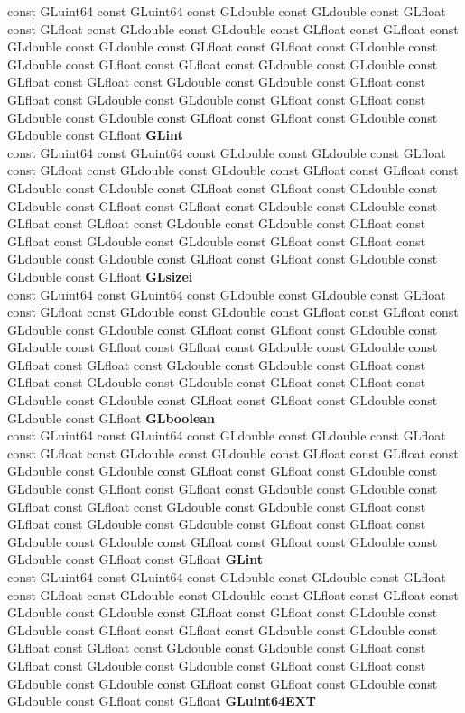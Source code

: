 \begin{DoxyCompactItemize}
\begin{tabbing}
\>const GLuint64 const GLuint64 const GLdouble const GLdouble const GLfloat const GLfloat const GLdouble const GLdouble const GLfloat const GLfloat const GLdouble const GLdouble const GLfloat const GLfloat const GLdouble const GLdouble const GLfloat const GLfloat const GLdouble const GLdouble const GLfloat const GLfloat const GLdouble const GLdouble const GLfloat const GLfloat const GLdouble const GLdouble const GLfloat const GLfloat const GLdouble const GLdouble const GLfloat const GLfloat const GLdouble const GLdouble const GLfloat {\bfseries GLint}\\
\>const GLuint64 const GLuint64 const GLdouble const GLdouble const GLfloat const GLfloat const GLdouble const GLdouble const GLfloat const GLfloat const GLdouble const GLdouble const GLfloat const GLfloat const GLdouble const GLdouble const GLfloat const GLfloat const GLdouble const GLdouble const GLfloat const GLfloat const GLdouble const GLdouble const GLfloat const GLfloat const GLdouble const GLdouble const GLfloat const GLfloat const GLdouble const GLdouble const GLfloat const GLfloat const GLdouble const GLdouble const GLfloat {\bfseries GLsizei}\\
\>const GLuint64 const GLuint64 const GLdouble const GLdouble const GLfloat const GLfloat const GLdouble const GLdouble const GLfloat const GLfloat const GLdouble const GLdouble const GLfloat const GLfloat const GLdouble const GLdouble const GLfloat const GLfloat const GLdouble const GLdouble const GLfloat const GLfloat const GLdouble const GLdouble const GLfloat const GLfloat const GLdouble const GLdouble const GLfloat const GLfloat const GLdouble const GLdouble const GLfloat const GLfloat const GLdouble const GLdouble const GLfloat {\bfseries GLboolean}\\
\>const GLuint64 const GLuint64 const GLdouble const GLdouble const GLfloat const GLfloat const GLdouble const GLdouble const GLfloat const GLfloat const GLdouble const GLdouble const GLfloat const GLfloat const GLdouble const GLdouble const GLfloat const GLfloat const GLdouble const GLdouble const GLfloat const GLfloat const GLdouble const GLdouble const GLfloat const GLfloat const GLdouble const GLdouble const GLfloat const GLfloat const GLdouble const GLdouble const GLfloat const GLfloat const GLdouble const GLdouble const GLfloat const GLfloat {\bfseries GLint}\\
\>const GLuint64 const GLuint64 const GLdouble const GLdouble const GLfloat const GLfloat const GLdouble const GLdouble const GLfloat const GLfloat const GLdouble const GLdouble const GLfloat const GLfloat const GLdouble const GLdouble const GLfloat const GLfloat const GLdouble const GLdouble const GLfloat const GLfloat const GLdouble const GLdouble const GLfloat const GLfloat const GLdouble const GLdouble const GLfloat const GLfloat const GLdouble const GLdouble const GLfloat const GLfloat const GLdouble const GLdouble const GLfloat const GLfloat {\bfseries GLuint64EXT}\\

\end{tabbing}
\end{DoxyCompactItemize}
